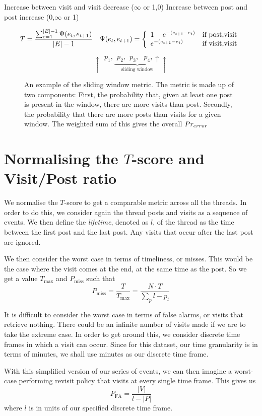 Increase between visit and visit	decrease
($\infty$ or 1,0)
Increase between post and post		increase
(0,$\infty$ or 1)

\[
	\begin{array}{l l}
	T = \dfrac{%
		\sum_{e=1}^{|E|-1} \Psi(e_t,e_{t+1}) %
	}{|E|-1} &
		\Psi(e_t,e_{t+1}) = \left\{\begin{array}{l l}
				1-e^{-(e_{t+1} - e_t)}	& \text{if post,visit}\\
				e^{-(e_{t+1} - e_t)}			& \text{if visit,visit}\\
		\end{array}\right.
\end{array}
\]

\begin{figure}
\[
	\uparrow~~p_1,\underbrace{~~p_2,~~p_3,~~~p_4,\uparrow}_{\text{sliding window}}\uparrow
\]
\caption{An example of the sliding window metric. The metric is made up of two components: First, the probability that, given at least one post is present in the window, there are more visits than post. Secondly, the probability that there are more posts than visits for a given window. The weighted sum of this gives the overall $Pr_{error}$}\label{prerror}
\end{figure}


\section{Normalising the $T$-score and Visit/Post ratio}
We normalise the $T$-score to get a comparable metric across all the threads. In 
order to do this, we consider again the thread posts and visits as a sequence of 
events. We then define the \emph{lifetime}, denoted as $l$, of the thread as the 
time between the first post and the last post. Any visits that occur after the 
last post are ignored.

We then consider the worst case in terms of timeliness, or misses. This would be 
the case where the visit comes at the end, at the same time as the post. So we 
get a value $T_{\max}$ and $P_{\text{miss}}$ such that
\[
	P_{\text{miss}} = \frac{T}{T_{\max}} = \dfrac{N \cdot T}{\sum_p l - p_t}
\]

It is difficult to consider the worst case in terms of false alarms, or visits 
that retrieve nothing. There could be an infinite number of visits made if we 
are to take the extreme case. In order to get around this, we consider discrete 
time frames in which a visit can occur. Since for this dataset, our time 
granularity is in terms of minutes, we shall use minutes as our discrete time 
frame.

With this simplified version of our series of events, we can then imagine a 
worst-case performing revisit policy that visits at every single time frame.  
This gives us
\[
	P_{\text{FA}} = \frac{|V|}{l - |P|}
\]
where $l$ is in units of our specified discrete time frame.


